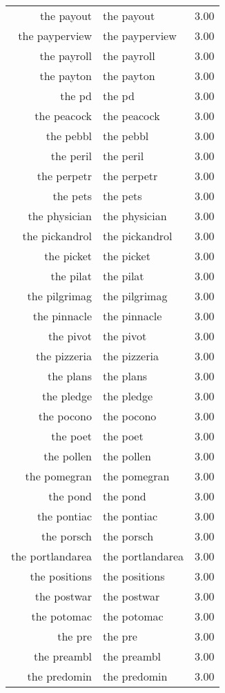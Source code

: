 \begin{table}[ht]
\begin{tabular}{rlr}
  the payout & the payout & 3.00 \\ 
  the payperview & the payperview & 3.00 \\ 
  the payroll & the payroll & 3.00 \\ 
  the payton & the payton & 3.00 \\ 
  the pd & the pd & 3.00 \\ 
  the peacock & the peacock & 3.00 \\ 
  the pebbl & the pebbl & 3.00 \\ 
  the peril & the peril & 3.00 \\ 
  the perpetr & the perpetr & 3.00 \\ 
  the pets & the pets & 3.00 \\ 
  the physician & the physician & 3.00 \\ 
  the pickandrol & the pickandrol & 3.00 \\ 
  the picket & the picket & 3.00 \\ 
  the pilat & the pilat & 3.00 \\ 
  the pilgrimag & the pilgrimag & 3.00 \\ 
  the pinnacle & the pinnacle & 3.00 \\ 
  the pivot & the pivot & 3.00 \\ 
  the pizzeria & the pizzeria & 3.00 \\ 
  the plans & the plans & 3.00 \\ 
  the pledge & the pledge & 3.00 \\ 
  the pocono & the pocono & 3.00 \\ 
  the poet & the poet & 3.00 \\ 
  the pollen & the pollen & 3.00 \\ 
  the pomegran & the pomegran & 3.00 \\ 
  the pond & the pond & 3.00 \\ 
  the pontiac & the pontiac & 3.00 \\ 
  the porsch & the porsch & 3.00 \\ 
  the portlandarea & the portlandarea & 3.00 \\ 
  the positions & the positions & 3.00 \\ 
  the postwar & the postwar & 3.00 \\ 
  the potomac & the potomac & 3.00 \\ 
  the pre & the pre & 3.00 \\ 
  the preambl & the preambl & 3.00 \\ 
  the predomin & the predomin & 3.00 \\ 

\end{tabular}
\end{table}

